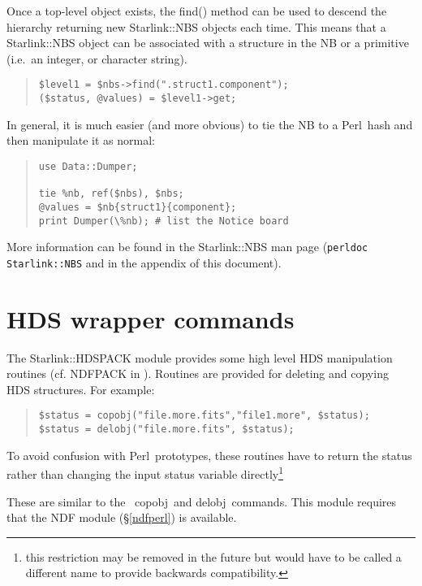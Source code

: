 \documentclass[twoside,11pt]{article}
\newenvironment{myquote}{\begin{quote}\begin{small}}{\end{small}\end{quote}}
\newcommand{\task}[1]{{\sf #1}}
\newcommand{\Kappa}{\xref{{\sc{Kappa}}}{sun95}{}}
\newcommand{\Figaro}{\xref{{\sc{Figaro}}}{sun86}{}}
\newcommand{\perl}{\xref{\textsf{Perl}}{sun193}{}}
\newcommand{\delobj}{\xref{\task{delobj}}{sun86}{DELOBJ}}
\newcommand{\copobj}{\xref{\task{copobj}}{sun86}{COPOBJ}}
\newcommand{\xref}[3]{#1}
\renewcommand{\_}{\texttt{\symbol{95}}}
\begin{document}
Once a top-level object exists, the find() method can be used to 
descend the hierarchy returning new Starlink::NBS objects each time.
This means that a Starlink::NBS object can be associated with a structure
in the NB or a primitive (i.e.\ an integer, or character string).

\begin{myquote}
\begin{verbatim}
$level1 = $nbs->find(".struct1.component");
($status, @values) = $level1->get;
\end{verbatim}
\end{myquote}

In general, it is much easier (and more obvious) to tie the NB
to a \perl\ hash and then manipulate it as normal:

\begin{myquote}
\begin{verbatim}
use Data::Dumper;

tie %nb, ref($nbs), $nbs;
@values = $nb{struct1}{component};
print Dumper(\%nb); # list the Notice board
\end{verbatim}
\end{myquote}

More information can be found in the Starlink::NBS man page
(\texttt{perldoc Starlink::NBS} and in the appendix of this document).


\section{HDS wrapper commands}
 
The Starlink::HDSPACK module provides some high level HDS manipulation
routines (cf. NDFPACK in \Kappa). Routines are provided for deleting and 
copying HDS structures. For example:

\begin{myquote}
\begin{verbatim}
$status = copobj("file.more.fits","file1.more", $status);
$status = delobj("file.more.fits", $status);
\end{verbatim}
\end{myquote}

To avoid confusion with \perl\ prototypes, these routines have to return
the status rather than changing the input status variable
directly\footnote{this restriction may be removed in the future but would have
  to be called a different name to provide backwards compatibility.}

 
These are similar to the \Figaro\ \copobj\ and \delobj\ commands.
This module requires that the NDF module (\S\ref{ndfperl}) is available.
\end{document}
